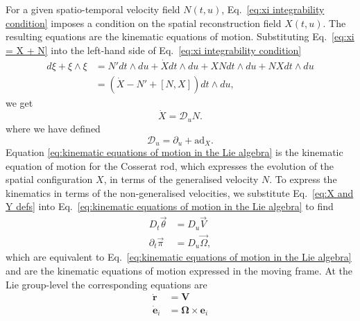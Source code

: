For a given spatio-temporal velocity field $N(t,u)$, Eq.~\ref{eq:xi integrability condition} imposes a condition on the spatial reconstruction field $X(t,u)$. The resulting equations are the kinematic equations of motion. Substituting Eq.~\ref{eq:xi = X + N} into the left-hand side of Eq.~\ref{eq:xi integrability condition}
\begin{equation}
\begin{aligned}
d \xi + \xi \wedge \xi & = N' dt \wedge du + \dot{X} dt \wedge du + X N dt \wedge du  + N X dt \wedge du \\ 
& = (\dot{X} - N' + [N, X]) dt \wedge du,
\end{aligned}
\end{equation}
we get
\begin{equation} \label{eq:kinematic equations of motion in the Lie algebra}
\dot{X} = \mathcal{D}_u N.
\end{equation}
where we have defined
\begin{equation}
\mathcal{D}_u = \partial_u + \text{ad}_X.
\end{equation}
Equation \ref{eq:kinematic equations of motion in the Lie algebra} is the kinematic equation of motion for the Cosserat rod, which expresses the evolution of the spatial configuration $X$, in terms of the generalised velocity $N$. To express the kinematics in terms of the non-generalised velocities, we substitute Eq.~\ref{eq:X and Y defs} into Eq.~\ref{eq:kinematic equations of motion in the Lie algebra} to find
\begin{subequations} \label{eq:kinematic equations of motion in the moving frame}
\begin{align}
D_t \vec{\theta} & = D_u \vec{V} \\
\partial_t \vec{\pi} & = D_u \vec{\Omega}, \label{eq:pi eom}
\end{align}
\end{subequations}
which are equivalent to Eq.~\ref{eq:kinematic equations of motion in the Lie algebra} and are the kinematic equations of motion expressed in the moving frame. At the Lie group-level the corresponding equations are
\begin{subequations} \label{eq:kinematic equations of motion in the fixed frame}
\begin{align}
\dot{\mathbf{r}} & = \mathbf{V} \\
\dot{\mathbf{e}}_i & = \boldsymbol{\Omega} \times \mathbf{e}_i \label{eq:e_i eom}
\end{align}
\end{subequations} %
